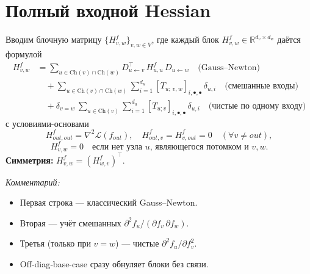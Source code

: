 \documentclass[a4paper,12pt]{article}
\newcommand{\Ch}{\mathrm{Ch}} %
\begin{document}
\section{Полный входной Hessian}
Вводим блочную матрицу \(\{H^f_{v,w}\}_{v,w\in V}\), где каждый блок \(H^f_{v,w}\in\mathbb{R}^{d_v\times
d_w}\) даётся формулой
\begin{equation}\label{eq:Hf}
  \boxed{
    \begin{split}
      H^f_{v,w}
      &=
      \sum_{u\in\Ch(v)\cap\Ch(w)}
      D_{u\gets v}^\top\,H^f_{u,u}\,D_{u\gets w}
      \quad\text{(Gauss–Newton)}\\
      &\quad+
      \sum_{u\in\Ch(v)\cap\Ch(w)}
      \sum_{i=1}^{d_u}
      [T_{u;\,v,w}]_{i,\bullet,\bullet}\,\delta_{u,i}
      \quad\text{(смешанные входы)}\\
      &\quad+
      \delta_{v=w}\,
      \sum_{u\in\Ch(v)}
      \sum_{i=1}^{d_u}
      [T_{u;v}]_{i,\bullet,\bullet}\,\delta_{u,i}
      \quad\text{(чистые по одному входу)}
    \end{split}
  }
\end{equation}
с условиями-основами
\[
  H^f_{out,out} = \nabla^2\mathcal L(f_{out}),
  \quad
  H^f_{out,v} = H^f_{v,out} = 0\quad (\forall v\neq out),
\]
\[
  H^f_{v,w} = 0
  \quad\text{если нет узла }u\text{, являющегося потомком и }v,w.
\]
\textbf{Симметрия:}\quad
$H^f_{v,w}=(H^f_{w,v})^\top$.

\emph{Комментарий:}
\begin{itemize}
  \item Первая строка — классический Gauss–Newton.
  \item Вторая — учёт смешанных $\partial^2 f_u/(\partial f_v\,\partial f_w)$.
  \item Третья (только при $v=w$) — чистые $\partial^2 f_u/\partial f_v^2$.
  \item Off‐diag‐base-case сразу обнуляет блоки без связи.
\end{itemize}
\end{document}
